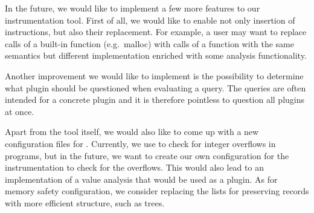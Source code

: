 In the future, we would like to implement a few more features to our
instrumentation tool. First of all, we would like to enable not only insertion
of instructions, but also their replacement. For example, a user may want to
replace calls of a built-in function (e.g.~malloc) with calls of a function
with the same semantics but different implementation enriched with some
analysis functionality.

Another improvement we would like to implement is the possibility to determine
what plugin should be questioned when evaluating a query. The queries are often
intended for a concrete plugin and it is therefore pointless to question all
plugins at once.

Apart from the tool itself, we would also like to come up with a new
configuration files for \symbiotic. Currently, we use \clang to check for
integer overflows in programs, but in the future, we want to create our own
configuration for the instrumentation to check for the overflows. This would
also lead to an implementation of a value analysis that would be used as a plugin.
As for memory safety configuration, we consider replacing the lists for
preserving records with more efficient structure, such as trees.

